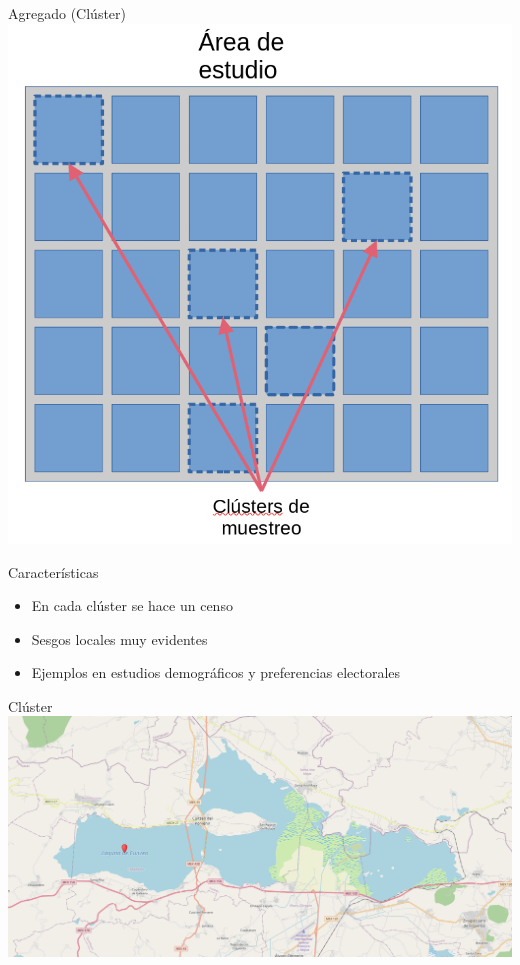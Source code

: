 \documentclass[
  11pt,
  ignorenonframetext,
]{beamer}
\begin{document}
\begin{frame}{Agregado (Clúster)}
\protect\hypertarget{agregado-cluxfaster}{}
\includegraphics{Figuras-tecnicas/Cluster.png}
\end{frame}

\begin{frame}{Características}
\protect\hypertarget{caracteruxedsticas-1}{}
\begin{itemize}
\item
  En cada clúster se hace un censo
\item
  Sesgos locales muy evidentes
\item
  Ejemplos en estudios demográficos y preferencias electorales
\end{itemize}
\end{frame}

\begin{frame}{Clúster}
\protect\hypertarget{cluxfaster}{}
\includegraphics{Figuras-tecnicas/Cuitzeo.png}
\end{frame}
\end{document}
